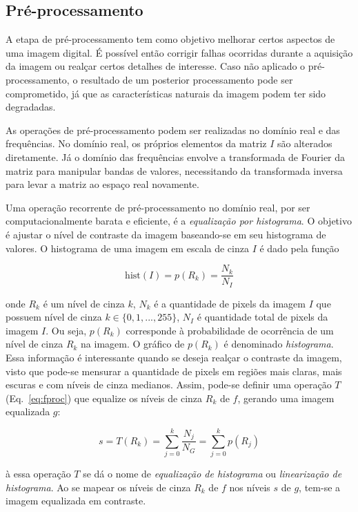 \subsection{Pré-processamento}
\label{sec:preproc}

A etapa de pré-processamento tem como objetivo melhorar certos
aspectos de uma imagem digital. É possível então corrigir falhas
ocorridas durante a aquisição da imagem ou realçar certos detalhes de
interesse. Caso não aplicado o pré-processamento, o resultado de um
posterior processamento pode ser comprometido, já que as
características naturais da imagem podem ter sido
degradadas.~\cite{gonzalez}

As operações de pré-processamento podem ser realizadas no domínio real
e das frequências. No domínio real, os próprios elementos da matriz
$I$ são alterados diretamente. Já o domínio das frequências envolve a
transformada de Fourier da matriz para manipular bandas de valores,
necessitando da transformada inversa para levar a matriz ao espaço
real novamente.

Uma operação recorrente de pré-processamento no domínio real, por ser
computacionalmente barata e eficiente, é a \emph{equalização por
  histograma}. O objetivo é ajustar o nível de contraste da imagem
baseando-se em seu histograma de valores. O histograma de uma imagem em escala de cinza
$I$ é dado pela função

\begin{equation}
\text{hist}(I) = p(R_k) = \frac{N_k}{N_I}
\end{equation}

\noindent onde $R_k$ é um nível de cinza $k$, $N_k$ é a quantidade de
pixels da imagem $I$ que possuem nível de cinza $k \in \{0, 1, ...,
255\}$, $N_I$ é quantidade total de pixels da imagem $I$. Ou seja,
$p(R_k)$ corresponde à probabilidade de ocorrência de um nível de
cinza $R_k$ na imagem. O gráfico de $p(R_k)$ é denominado
\emph{histograma}. Essa informação é interessante quando se deseja
realçar o contraste da imagem, visto que pode-se mensurar a quantidade
de pixels em regiões mais claras, mais escuras e com níveis de cinza
medianos. Assim, pode-se definir uma operação $T$ (Eq.~\ref{eq:fproc}) que equalize os
níveis de cinza $R_k$ de $f$, gerando uma imagem equalizada $g$:

\begin{equation}
s = T(R_k) = \sum_{j=0}^k \frac{N_j}{N_G} = \sum_{j=0}^k p(R_j)
\end{equation}

\noindent à essa operação $T$ se dá o nome de \emph{equalização de
  histograma} ou \emph{linearização de histograma}. Ao se mapear os
níveis de cinza $R_k$ de $f$ nos níveis $s$ de $g$, tem-se a imagem
equalizada em contraste.

